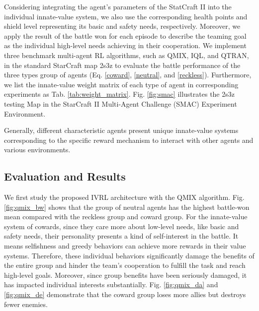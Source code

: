 \documentclass[letterpaper]{article} %
\begin{document}
Considering integrating the agent's parameters of the StatCraft II into the individual innate-value system, we also use the corresponding health points and shield level representing its basic and safety needs, respectively. Moreover, we apply the result of the battle won for each episode to describe the teaming goal as the individual high-level needs achieving in their cooperation. We implement three benchmark multi-agent RL algorithms, such as QMIX, IQL, and QTRAN, in the standard StarCraft map 2s3z to evaluate the battle performance of the three types group of agents (Eq. \eqref{coward}, \eqref{neutral}, and \eqref{reckless}). Furthermore, we list the innate-value weight matrix of each type of agent in corresponding experiments as Tab. \ref{tab:weight_matrix}. Fig. \ref{fig:smac} illustrates the 2s3z testing Map in the StarCraft II Multi-Agent Challenge (SMAC) Experiment Environment.

\begin{table}[h]
 \renewcommand\arraystretch{1.5}
 \caption{\small{Innate-Value Weight Matrix of Each Type of Agent in Experiments.}}
    \label{tab:weight_matrix}
\end{table}

Generally, different characteristic agents present unique innate-value systems corresponding to the specific reward mechanism to interact with other agents and various environments.

\subsection{Evaluation and Results}

We first study the proposed IVRL architecture with the QMIX algorithm. Fig. \ref{fig:qmix_bw} shows that the group of neutral agents has the highest battle-won mean compared with the reckless group and coward group. For the innate-value system of cowards, since they care more about low-level needs, like basic and safety needs, their personality presents a kind of self-interest in the battle. It means selfishness and greedy behaviors can achieve more rewards in their value systems. Therefore, these individual behaviors significantly damage the benefits of the entire group and hinder the team's cooperation to fulfill the task and reach high-level goals. Moreover, since group benefits have been seriously damaged, it has impacted individual interests substantially. Fig. \ref{fig:qmix_da} and \ref{fig:qmix_de} demonstrate that the coward group loses more allies but destroys fewer enemies.
\end{document}
